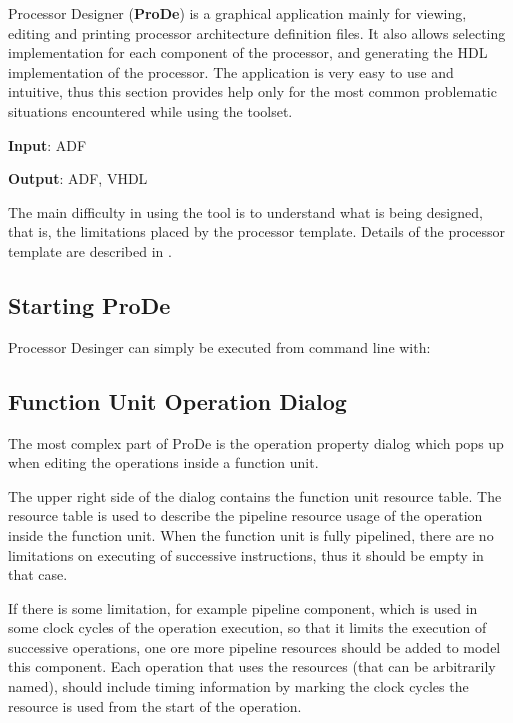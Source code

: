 \documentclass[twoside]{tceusermanual}
\begin{document}
Processor Designer (\textbf{ProDe}) is a graphical application mainly for
viewing, editing and printing processor architecture definition files. 
It also allows selecting implementation for each component of the processor,
and generating the HDL implementation of the processor. The application is
very easy to use and intuitive, thus this section provides help only for the
most common problematic situations encountered while using the toolset.

\textbf{Input}: ADF

\textbf{Output}: ADF, VHDL

The main difficulty in using the tool is to understand what is being
designed, that is, the limitations placed by the processor template. 
Details of the processor template are described in \cite{ADF-specs}.


\subsection{Starting ProDe}

Processor Desinger can simply be executed from command line with:


\subsection{Function Unit Operation Dialog}

The most complex part of ProDe is the operation property dialog which pops
up when editing the operations inside a function unit.


The upper right side of the dialog contains the function unit resource table.
The resource table is used to describe the pipeline resource usage of the
operation inside the function unit.
When the function unit is fully pipelined, there are no limitations on
executing of successive instructions, thus it should be empty in that case.

If there is some limitation, for example pipeline component, which is used in 
some clock cycles of the operation execution, so that it limits the execution of 
successive operations, one ore more pipeline resources should be added to model 
this component. Each operation that uses the resources (that can be arbitrarily
named), should include timing information by marking the clock cycles the resource
is used from the start of the operation.
\end{document}
